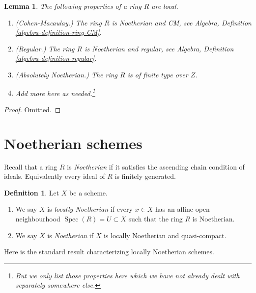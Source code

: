 \documentclass{stacks-project}
\theoremstyle{plain}
\newtheorem{lemma}[subsection]{Lemma}
\theoremstyle{definition}
\newtheorem{definition}[subsection]{Definition}
\theoremstyle{remark}
\numberwithin{equation}{subsection}
\def\Spec{\mathop{\mathrm{Spec}}}
\begin{document}
\begin{lemma}
\label{lemma-properties-local}
The following properties of a ring $R$ are local.
\begin{enumerate}
\item (Cohen-Macaulay.)
The ring $R$ is Noetherian and CM, see
Algebra, Definition \ref{algebra-definition-ring-CM}.
\item (Regular.)
The ring $R$ is Noetherian and regular, see
Algebra, Definition \ref{algebra-definition-regular}.
\item (Absolutely Noetherian.)
The ring $R$ is of finite type over $Z$.
\item Add more here as needed.\footnote{But we only list those properties
here which we have not already dealt with separately somewhere else.}
\end{enumerate}
\end{lemma}

\begin{proof}
Omitted.
\end{proof}















\section{Noetherian schemes}
\label{section-noetherian}

\noindent
Recall that a ring $R$ is {\it Noetherian} if it satisfies the ascending
chain condition of ideals. Equivalently every ideal of $R$ is finitely
generated.

\begin{definition}
\label{definition-noetherian}
Let $X$ be a scheme.
\begin{enumerate}
\item We say $X$ is {\it locally Noetherian} if every
$x \in X$ has an affine open neighbourhood
$\Spec(R) = U \subset X$ such that the ring $R$ is Noetherian.
\item We say $X$ is {\it Noetherian} if $X$ is locally Noetherian
and quasi-compact.
\end{enumerate}
\end{definition}

\noindent
Here is the standard result characterizing locally Noetherian schemes.
\end{document}
